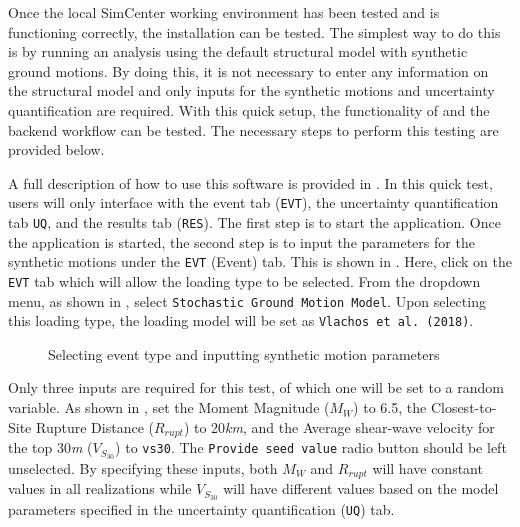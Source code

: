 Once the local SimCenter working environment has been tested and is
functioning correctly, the \texttt{\getsoftwarename{}} installation
can be tested. The simplest way to do this is by running an analysis
using the default structural model with synthetic ground motions. By
doing this, it is not necessary to enter any information on the
structural model and only inputs for the synthetic motions and
uncertainty quantification are required. With this quick setup, the
functionality of \texttt{\getsoftwarename{}} and the backend
workflow can be tested. The necessary steps to perform this
testing are provided below.

A full description of how to use this software is provided
in .  In this quick test, users will only
interface with the event tab (\texttt{EVT}), the uncertainty
quantification tab \texttt{UQ}, and the results tab (\texttt{RES}).
The first step is to start the \texttt{\getsoftwarename{}}
application.  Once the application is started, the second step is to
input the parameters for the synthetic motions under the \texttt{EVT}
(Event) tab. This is shown in . Here, click
on the \texttt{EVT} tab which will allow the loading type to be
selected. From the dropdown menu, as shown
in , select \texttt{Stochastic Ground Motion
Model}. Upon selecting this loading type, the loading model will be
set as \texttt{Vlachos et al. (2018)}.

\begin{figure}[!htbp]
  \caption{Selecting event type and inputting synthetic motion parameters}
  \label{fig:input_event}
\end{figure}

Only three inputs are required for this test, of which one will be set
to a random variable. As shown in , set the
Moment Magnitude ($M_W$) to 6.5, the Closest-to-Site Rupture Distance
($R_{rupt}$) to 20\textit{km}, and the Average shear-wave velocity
for the top 30\textit{m} ($V_{S_{30}}$)
to \texttt{vs30}. The \texttt{Provide seed value} radio button should
be left unselected. By specifying these inputs, both $M_{W}$ and $R_{rupt}$
will have constant values in all realizations while $V_{S_{30}}$ will
have different values based on the model parameters specified in the
uncertainty quantification (\texttt{UQ}) tab.

